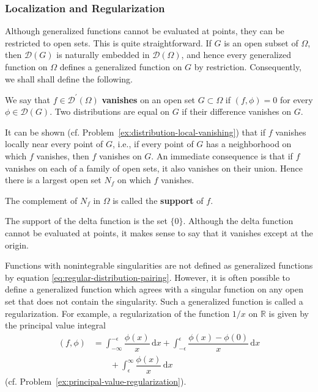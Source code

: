 \subsubsection{Localization and Regularization}\label{subsec:distribution-localization}

Although generalized functions cannot be evaluated at points, they can be restricted to open sets. This is quite straightforward. If $G$ is an open subset of $\Omega$, then $\mathcal{D}(G)$ is naturally embedded in $\mathcal{D}(\Omega)$, and hence every generalized function on $\Omega$ defines a generalized function on $G$ by restriction. Consequently, we shall shall define the following.

\begin{Definition}
\label{def:distribution-vanishing}
We say that $f\in\mathcal{D}^{\prime}(\Omega)$ \textbf{vanishes} on an open set $G\subset\Omega$ if $(f,\phi)=0$ for every $\phi\in\mathcal{D}(G)$. Two distributions are equal on $G$ if their difference vanishes on $G$.
\end{Definition}

It can be shown (cf. Problem~\ref{ex:distribution-local-vanishing}) that if $f$ vanishes locally near every point of $G$, i.e., if every point of $G$ has a neighborhood on which $f$ vanishes, then $f$ vanishes on $G$. An immediate consequence is that if $f$ vanishes on each of a family of open sets, it also vanishes on their union. Hence there is a largest open set $N_f$ on which $f$ vanishes.

\begin{Definition}
\label{def:distribution-support}
The complement of $N_f$ in $\Omega$ is called the \textbf{support} of $f$.
\end{Definition}

\begin{Example}
\label{ex:delta-support}
The support of the delta function is the set $\{0\}$. Although the delta function cannot be evaluated at points, it makes sense to say that it vanishes except at the origin.
\end{Example}

\begin{Remark}
\label{rem:singular-function-regularization}
Functions with nonintegrable singularities are not defined as generalized functions by equation \eqref{eq:regular-distribution-pairing}. However, it is often possible to define a generalized function which agrees with a singular function on any open set that does not contain the singularity. Such a generalized function is called a regularization. For example, a regularization of the function $1/x$ on $\mathbb{R}$ is given by the principal value integral
\begin{equation}\label{eq:principal-value-one-over-x-regularization}
\begin{aligned}
(f,\phi)&=\int_{-\infty}^{-\epsilon}\dfrac{\phi(x)}x\,\mathrm{d}x
+\int_{-\epsilon}^{\epsilon}\dfrac{\phi(x)-\phi(0)}x\,\mathrm{d}x\\
&\qquad+\int_\epsilon^\infty\dfrac{\phi(x)}x\,\mathrm{d}x
\end{aligned}
\end{equation}
(cf. Problem~\ref{ex:principal-value-regularization}).
\end{Remark}
